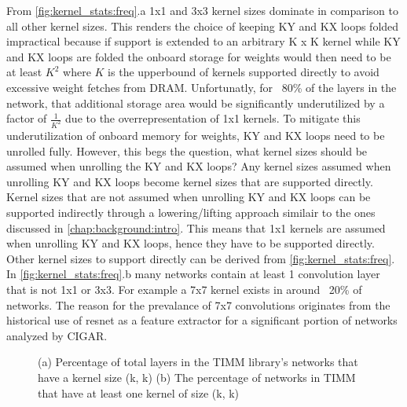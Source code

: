 From \autoref{fig:kernel_stats:freq}.a 1x1 and 3x3 kernel sizes dominate in
comparison to all other kernel sizes. This renders the choice of keeping KY and
KX loops folded impractical because if support is extended to an arbitrary K x K
kernel while KY and KX loops are folded the onboard storage for weights would
then need to be at least $K^2$ where $K$ is the upperbound of kernels supported
directly to avoid excessive weight fetches from DRAM. Unfortunatly, for ~80\% of
the layers in the network, that additional storage area would be significantly
underutilized by a factor of $\frac{1}{K^2}$ due to the overrepresentation of
1x1 kernels. To mitigate this underutilization of onboard memory for weights, KY
and KX loops need to be unrolled fully. However, this begs the question, what
kernel sizes should be assumed when unrolling the KY and KX loops? Any kernel
sizes assumed when unrolling KY and KX loops become kernel sizes that are
supported directly. Kernel sizes that are not assumed when unrolling KY and KX
loops can be supported indirectly through a lowering/lifting approach similair
to the ones discussed in \autoref{chap:background:intro}. This means that 1x1 kernels are assumed when
unrolling KY and KX loops, hence they have to be supported directly.
Other kernel sizes to support directly can be derived from
\autoref{fig:kernel_stats:freq}. In \autoref{fig:kernel_stats:freq}.b many networks contain at least 1 convolution
layer that is not 1x1 or 3x3. For example a 7x7 kernel exists in around ~20\% of
networks. The reason for the prevalance of 7x7 convolutions originates from the
historical use of resnet \cite{resnet} as a feature extractor for a significant
portion of networks analyzed by CIGAR.

\clearpage
\begin{figure}
    \centering
    \caption{(a) Percentage of total layers in the TIMM library's networks that have a kernel size (k, k) (b) The percentage of networks in TIMM that have at least one kernel of size (k, k)}
    \label{fig:kernel_stats:freq}
\end{figure}


